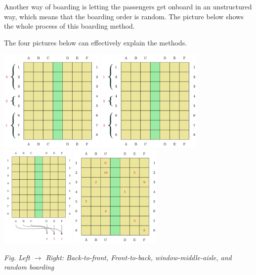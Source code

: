 \documentclass{article}
\theoremstyle{definition}
\theoremstyle{remark}
\numberwithin{equation}{section}
\begin{document}
	Another way of boarding is letting the passengers get onboard in an unstructured way, which means that the boarding order is random. The picture below shows the whole process of this boarding method.

	The four pictures below can effectively explain the methods.

	\begin{center}
		\includegraphics[height=5cm]{planerow1.jpg}
		\includegraphics[height=5cm]{planerow2.jpg}\\
		\includegraphics[height=5cm]{wdmd.jpg}
		\includegraphics[height=5cm]{planerandom.jpg}

		\small \textit{Fig. Left \(\to\) Right: Back-to-front, Front-to-back, window-middle-aisle, and random boarding}
	\end{center}
\end{document}
